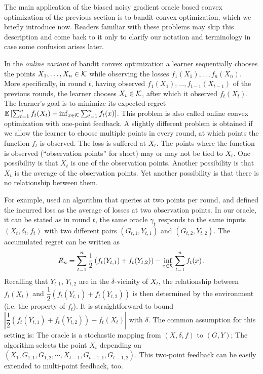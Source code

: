 The main application of the biased noisy gradient oracle based convex optimization of the previous section 
is to bandit convex optimization, which we briefly introduce now. Readers familiar with these problems may skip this description
and come back to it only to clarify our notation and terminology in case some confusion arises later.

In the \emph{online variant} of bandit convex optimization a learner sequentially chooses the points $X_1,\dots,X_n\in \mathcal{K}$ while observing the losses $f_1(X_1),\dots,f_n(X_n)$. More specifically, in round $t$, having observed $f_1(X_1),\dots,f_{t-1}(X_{t-1})$ of the previous rounds, the learner chooses $X_t\in \mathcal{K}$, after which it observed $f_t(X_t)$. The learner's goal is to minimize its expected regret $\mathbb{E}\left[ \sum_{t=1}^n f_t(X_t) - \inf_{x\in \mathcal{K}} \sum_{t=1}^n f_t(x) \right]$. 
This problem is also called online convex optimization with one-point feedback.
A slightly different problem is obtained if we allow the learner to choose multiple points in every round, at which points the function $f_t$ is observed. The loss is suffered at $X_t$. The points where the function is observed (``observation points'' for short) may or may not be tied to $X_t$. One possibility is that $X_t$ is one of the observation points.  
Another possibility is that $X_t$ is the average of the observation points. Yet another possibility is that there is no relationship between them. 

For example, \cite{AgDeXi10} used an algorithm that queries at two points per round, and defined the incurred loss as the average of losses at two observation points. In our oracle, it can be stated as in round $t$, the same oracle $\gamma_t$ responds to the same inputs $(X_t, \delta_t, f_t)$ with two different pairs $(G_{t,1}, Y_{t,1})$ and $(G_{t,2}, Y_{t,2})$. The accumulated regret can be written as 
\[
R_n = \sum_{t=1}^n \dfrac{1}{2}\left( f_t(Y_{t,1})+f_t(Y_{t,2}) \right) -\inf_{x \in \mathcal{K}}\sum_{t=1}^n f_t(x) \,.
\]
Recalling that $Y_{t,1}$, $Y_{t,2}$ are in the $\delta$-vicinity of $X_t$, the relationship between $f_t(X_t)$ and $\dfrac{1}{2}\left( f_t(Y_{t,1})+f_t(Y_{t,2})\right)$ is then determined by the environment (i.e. the property of $f_t$). It is straightforward to bound $| \dfrac{1}{2}\left( f_t(Y_{t,1})+f_t(Y_{t,2})\right)- f_t(X_t)|$ with $\delta$.
The common assumption for this setting is: The oracle is a stochastic mapping from $(X, \delta, f)$ to $(G, Y)$; The algorithm selects the point $X_t$ depending on $\left( X_1, G_{1,1}, G_{1,2}, \cdots, X_{t-1},G_{t-1,1}, G_{t-1,2}  \right)$. This two-point feedback can be easily extended to multi-point feedback, too.


